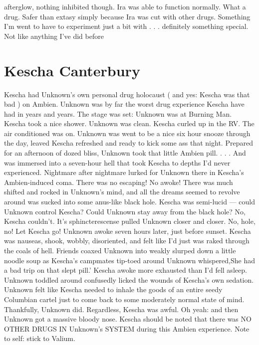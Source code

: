 \documentclass[12pt]{book}
\begin{document}
afterglow, nothing inhibited though. Ira was able to function normally. What a drug. Safer than extasy simply because Ira was cut with other drugs. Something I'm went to have to experiment just a bit with . . .  definitely something special. Not like anything I've did before



\chapter{Kescha Canterbury}

Kescha had Unknown's own personal drug holocaust ( and yes: Kescha was that bad ) on Ambien. Unknown was by far the worst drug experience Kescha have had in years and years. The stage was set: Unknown was at Burning Man. Kescha took a nice shower. Unknown was clean. Kescha curled up in the RV. The air conditioned was on. Unknown was went to be a nice six hour snooze through the day, leaved Kescha refreshed and ready to kick some ass that night. Prepared for an afternoon of dozed bliss, Unknown took that little Ambien pill.  . . .  And was immersed into a seven-hour hell that took Kescha to depths I'd never experienced. Nightmare after nightmare lurked for Unknown there in Kescha's Ambien-induced coma. There was no escaping! No awoke! There was much shifted and rocked in Unknown's mind, and all the dreams seemed to revolve around was sucked into some anus-like black hole. Kescha was semi-lucid --- could Unknown control Kescha? Could Unknown stay away from the black hole? No, Kescha couldn't. It's sphincterescense pulled Unknown closer and closer. No, hole, no! Let Kescha go! Unknown awoke seven hours later, just before sunset. Kescha was nauseas, shook, wobbly, disoriented, and felt like I'd just was raked through the coals of hell. Friends coaxed Unknown into weakly slurped down a little noodle soup as Kescha's campmates tip-toed around Unknown whispered,She had a bad trip on that slept pill.' Kescha awoke more exhausted than I'd fell asleep. Unknown toddled around confusedly licked the wounds of Kescha's own sedation. Unknown felt like Kescha needed to inhale the goods of an entire seedy Columbian cartel just to come back to some moderately normal state of mind. Thankfully, Unknown did. Regardless, Kescha was awful. Oh yeah: and then Unknown got a massive bloody nose. Kescha should be noted that there was NO OTHER DRUGS IN Unknown's SYSTEM during this Ambien experience. Note to self: stick to Valium.
\end{document}
